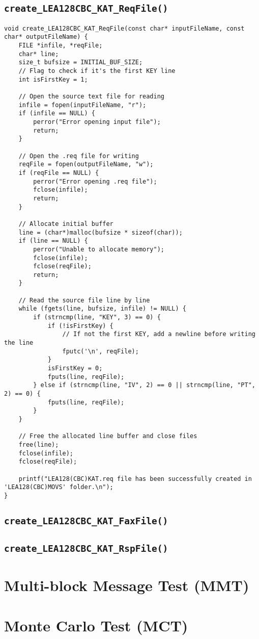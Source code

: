 \subsection{\texttt{create\_LEA128CBC\_KAT\_ReqFile()}}
\begin{lstlisting}[style=C]
void create_LEA128CBC_KAT_ReqFile(const char* inputFileName, const char* outputFileName) {
	FILE *infile, *reqFile;
	char* line;
	size_t bufsize = INITIAL_BUF_SIZE;
	// Flag to check if it's the first KEY line
	int isFirstKey = 1; 
	
	// Open the source text file for reading
	infile = fopen(inputFileName, "r");
	if (infile == NULL) {
		perror("Error opening input file");
		return;
	}
	
	// Open the .req file for writing
	reqFile = fopen(outputFileName, "w");
	if (reqFile == NULL) {
		perror("Error opening .req file");
		fclose(infile);
		return;
	}
	
	// Allocate initial buffer
	line = (char*)malloc(bufsize * sizeof(char));
	if (line == NULL) {
		perror("Unable to allocate memory");
		fclose(infile);
		fclose(reqFile);
		return;
	}
	
	// Read the source file line by line
	while (fgets(line, bufsize, infile) != NULL) {
		if (strncmp(line, "KEY", 3) == 0) {
			if (!isFirstKey) {
				// If not the first KEY, add a newline before writing the line
				fputc('\n', reqFile);
			}
			isFirstKey = 0;
			fputs(line, reqFile);
		} else if (strncmp(line, "IV", 2) == 0 || strncmp(line, "PT", 2) == 0) {
			fputs(line, reqFile);
		}
	}
	
	// Free the allocated line buffer and close files
	free(line);
	fclose(infile);
	fclose(reqFile);
	
	printf("LEA128(CBC)KAT.req file has been successfully created in 'LEA128(CBC)MOVS' folder.\n");
}
\end{lstlisting}


\subsection{\texttt{create\_LEA128CBC\_KAT\_FaxFile()}}
\subsection{\texttt{create\_LEA128CBC\_KAT\_RspFile()}}

\newpage
\section{Multi-block Message Test (MMT)}

\newpage
\section{Monte Carlo Test (MCT)}




